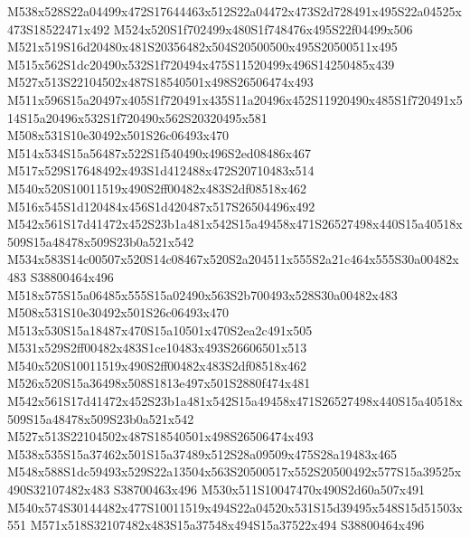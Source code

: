 \documentclass{article}
\begin{document}
\begin{multicols}{2}


M538x528S22a04499x472S17644463x512S22a04472x473S2d728491x495S22a04525x473S18522471x492 M524x520S1f702499x480S1f748476x495S22f04499x506 M521x519S16d20480x481S20356482x504S20500500x495S20500511x495 M515x562S1dc20490x532S1f720494x475S11520499x496S14250485x439 M527x513S22104502x487S18540501x498S26506474x493 M511x596S15a20497x405S1f720491x435S11a20496x452S11920490x485S1f720491x514S15a20496x532S1f720490x562S20320495x581 M508x531S10e30492x501S26c06493x470 M514x534S15a56487x522S1f540490x496S2ed08486x467 M517x529S17648492x493S1d412488x472S20710483x514 M540x520S10011519x490S2ff00482x483S2df08518x462 M516x545S1d120484x456S1d420487x517S26504496x492 M542x561S17d41472x452S23b1a481x542S15a49458x471S26527498x440S15a40518x509S15a48478x509S23b0a521x542 M534x583S14c00507x520S14c08467x520S2a204511x555S2a21c464x555S30a00482x483 S38800464x496 M518x575S15a06485x555S15a02490x563S2b700493x528S30a00482x483 M508x531S10e30492x501S26c06493x470 M513x530S15a18487x470S15a10501x470S2ea2c491x505 M531x529S2ff00482x483S1ce10483x493S26606501x513 M540x520S10011519x490S2ff00482x483S2df08518x462 M526x520S15a36498x508S1813e497x501S2880f474x481 M542x561S17d41472x452S23b1a481x542S15a49458x471S26527498x440S15a40518x509S15a48478x509S23b0a521x542 M527x513S22104502x487S18540501x498S26506474x493 M538x535S15a37462x501S15a37489x512S28a09509x475S28a19483x465 M548x588S1dc59493x529S22a13504x563S20500517x552S20500492x577S15a39525x490S32107482x483 S38700463x496 M530x511S10047470x490S2d60a507x491 M540x574S30144482x477S10011519x494S22a04520x531S15d39495x548S15d51503x551 M571x518S32107482x483S15a37548x494S15a37522x494 S38800464x496





\end{multicols}
\end{document}

